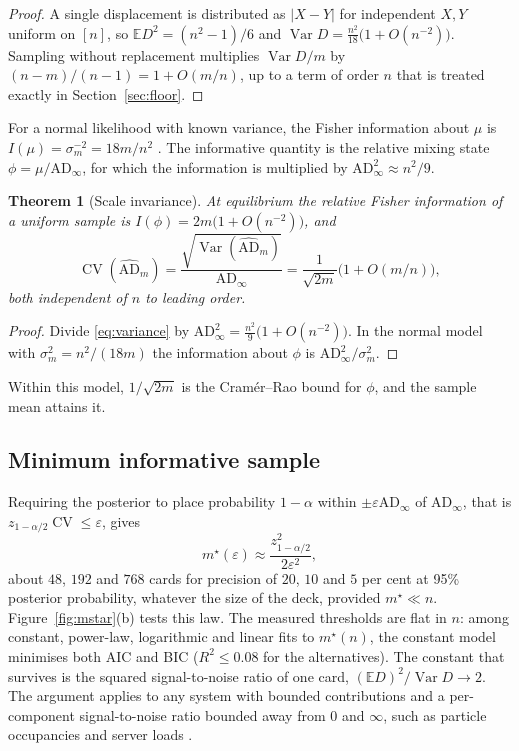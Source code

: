 \documentclass[ba,preprint]{imsart}
\theoremstyle{plain}
\newtheorem{theorem}{Theorem}[section]
\theoremstyle{definition}
\newcommand{\E}{\mathbb{E}}
\newcommand{\Var}{\operatorname{Var}}
\newcommand{\CV}{\operatorname{CV}}
\newcommand{\AD}{\mathrm{AD}}
\newcommand{\ADh}{\widehat{\mathrm{AD}}}
\begin{document}
\begin{proof}
A single displacement is distributed as $|X-Y|$ for independent $X,Y$ uniform on $[n]$, so $\E D^2=(n^2-1)/6$ and $\Var D=\frac{n^2}{18}\bigl(1+O(n^{-2})\bigr)$. Sampling without replacement multiplies $\Var D/m$ by $(n-m)/(n-1)=1+O(m/n)$, up to a term of order $n$ that is treated exactly in Section~\ref{sec:floor}.
\end{proof}

For a normal likelihood with known variance, the Fisher information about $\mu$ is $I(\mu)=\sigma_m^{-2}=18m/n^2$ \citep{LehmannCasella1998}. The informative quantity is the relative mixing state $\phi=\mu/\AD_\infty$, for which the information is multiplied by $\AD_\infty^2\approx n^2/9$.

\begin{theorem}[Scale invariance]\label{thm:scale}
At equilibrium the relative Fisher information of a uniform sample is $I(\phi)=2m\bigl(1+O(n^{-2})\bigr)$, and
\begin{equation}\label{eq:cv}
\CV(\ADh_m)=\frac{\sqrt{\Var(\ADh_m)}}{\AD_\infty}=\frac{1}{\sqrt{2m}}\bigl(1+O(m/n)\bigr),
\end{equation}
both independent of $n$ to leading order.
\end{theorem}

\begin{proof}
Divide \eqref{eq:variance} by $\AD_\infty^2=\frac{n^2}{9}\bigl(1+O(n^{-2})\bigr)$. In the normal model with $\sigma_m^2=n^2/(18m)$ the information about $\phi$ is $\AD_\infty^2/\sigma_m^2$.
\end{proof}

Within this model, $1/\sqrt{2m}$ is the Cram\'er--Rao bound for $\phi$, and the sample mean attains it.

\subsection{Minimum informative sample}

Requiring the posterior to place probability $1-\alpha$ within $\pm\varepsilon\AD_\infty$ of $\AD_\infty$, that is $z_{1-\alpha/2}\CV\le\varepsilon$, gives
\begin{equation}\label{eq:mstar}
m^\star(\varepsilon)\approx\frac{z_{1-\alpha/2}^2}{2\varepsilon^2},
\end{equation}
about $48$, $192$ and $768$ cards for precision of $20$, $10$ and $5$ per cent at 95\% posterior probability, whatever the size of the deck, provided $m^\star\ll n$. Figure~\ref{fig:mstar}(b) tests this law. The measured thresholds are flat in $n$: among constant, power-law, logarithmic and linear fits to $m^\star(n)$, the constant model minimises both AIC and BIC ($R^2\le0.08$ for the alternatives). The constant that survives is the squared signal-to-noise ratio of one card, $(\E D)^2/\Var D\to2$. The argument applies to any system with bounded contributions and a per-component signal-to-noise ratio bounded away from $0$ and $\infty$, such as particle occupancies \citep{Liggett1985} and server loads \citep{Mitzenmacher2001}.
\end{document}
